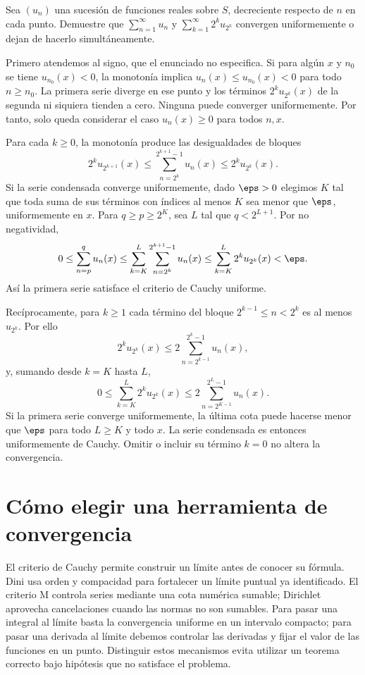 \begin{ejercicio}
Sea $(u_n)$ una sucesión de funciones reales sobre $S$, decreciente respecto de $n$ en cada punto. Demuestre que $\sum_{n=1}^\infty u_n$ y $\sum_{k=1}^\infty 2^ku_{2^k}$ convergen uniformemente o dejan de hacerlo simultáneamente.
\end{ejercicio}
\begin{solucion}
Primero atendemos al signo, que el enunciado no especifica. Si para algún $x$ y $n_0$ se tiene $u_{n_0}(x)<0$, la monotonía implica $u_n(x)\le u_{n_0}(x)<0$ para todo $n\ge n_0$. La primera serie diverge en ese punto y los términos $2^ku_{2^k}(x)$ de la segunda ni siquiera tienden a cero. Ninguna puede converger uniformemente. Por tanto, solo queda considerar el caso $u_n(x)\ge0$ para todos $n,x$.

Para cada $k\ge0$, la monotonía produce las desigualdades de bloques
\[
 2^ku_{2^{k+1}}(x)
 \le\sum_{n=2^k}^{2^{k+1}-1}u_n(x)
 \le2^ku_{2^k}(x).
\]
Si la serie condensada converge uniformemente, dado $\eps>0$ elegimos $K$ tal que toda suma de sus términos con índices al menos $K$ sea menor que $\eps$, uniformemente en $x$. Para $q\ge p\ge2^K$, sea $L$ tal que $q<2^{L+1}$. Por no negatividad,
\[
 0\le\sum_{n=p}^qu_n(x)
 \le\sum_{k=K}^L\sum_{n=2^k}^{2^{k+1}-1}u_n(x)
 \le\sum_{k=K}^L2^ku_{2^k}(x)<\eps.
\]
Así la primera serie satisface el criterio de Cauchy uniforme.

Recíprocamente, para $k\ge1$ cada término del bloque $2^{k-1}\le n<2^k$ es al menos $u_{2^k}$. Por ello
\[
 2^ku_{2^k}(x)\le2\sum_{n=2^{k-1}}^{2^k-1}u_n(x),
\]
y, sumando desde $k=K$ hasta $L$,
\[
 0\le\sum_{k=K}^L2^ku_{2^k}(x)
 \le2\sum_{n=2^{K-1}}^{2^L-1}u_n(x).
\]
Si la primera serie converge uniformemente, la última cota puede hacerse menor que $\eps$ para todo $L\ge K$ y todo $x$. La serie condensada es entonces uniformemente de Cauchy. Omitir o incluir su término $k=0$ no altera la convergencia.
\end{solucion}

\section{Cómo elegir una herramienta de convergencia}
El criterio de Cauchy permite construir un límite antes de conocer su fórmula. Dini usa orden y compacidad para fortalecer un límite puntual ya identificado. El criterio M controla series mediante una cota numérica sumable; Dirichlet aprovecha cancelaciones cuando las normas no son sumables. Para pasar una integral al límite basta la convergencia uniforme en un intervalo compacto; para pasar una derivada al límite debemos controlar las derivadas y fijar el valor de las funciones en un punto. Distinguir estos mecanismos evita utilizar un teorema correcto bajo hipótesis que no satisface el problema.
